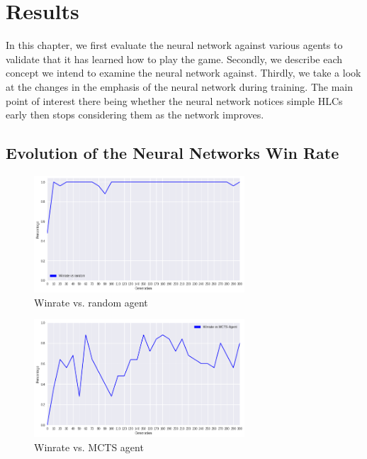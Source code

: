 \chapter{Results}

\label{cha:results}

In this chapter, we first evaluate the neural network against various agents to validate that it has learned how to play the game. Secondly, we describe each concept we intend to examine the neural network against. Thirdly, we take a look at the changes in the emphasis of the neural network during training. The main point of interest there being whether the neural network notices simple HLCs early then stops considering them as the network improves.

\section{Evolution of the Neural Networks Win Rate}

\begin{figure}
    \begin{small}
        \begin{center}
            \includegraphics[width=0.7\textwidth]{graphics/winratevsrandom.png}
        \end{center}
        \caption{Winrate vs. random agent}
        \label{fig:winratevsrandom}
    \end{small}
\end{figure}

\begin{figure}
    \begin{small}
        \begin{center}
            \includegraphics[width=0.7\textwidth]{graphics/winratevsmcts.png}
        \end{center}
        \caption{Winrate vs. MCTS agent}
        \label{fig:winratevsmcts}
    \end{small}
\end{figure}

